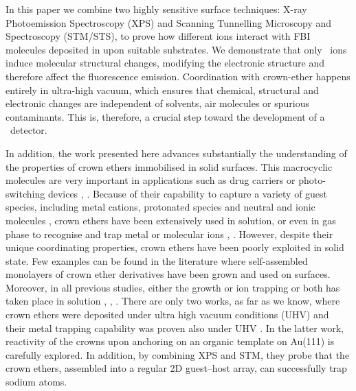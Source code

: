 \documentclass[aps,prl,reprint,longbibliography,superscriptaddress, english]{revtex4-1}
\begin{document}
In this paper we combine two highly sensitive surface techniques: X-ray Photoemission Spectroscopy (XPS) and Scanning Tunnelling Microscopy and Spectroscopy (STM/STS), to prove how different ions interact with FBI molecules deposited in upon suitable substrates. We demonstrate that only \Bapp\ ions induce molecular structural changes, modifying the electronic structure and therefore affect the fluorescence emission. Coordination with crown-ether happens entirely in ultra-high vacuum, which ensures that chemical, structural and electronic changes are independent of solvents, air molecules or spurious contaminants. This is, therefore, a crucial step toward the development of a \Bapp\ detector. 

In addition, the work presented here advances substantially the understanding of the properties of crown ethers immobilised in solid surfaces. 
This macrocyclic molecules are very important in applications such as drug carriers \cite{uchegbu_non-ionic_1998} or photo-switching devices \cite{malval_photoswitching_2002}, \cite{uda_membrane_2005}. Because of their capability to capture a variety of guest species, including metal cations, protonated species and neutral and ionic molecules \cite{dobler1981ionophores}, crown ethers \cite{gokel_crown_1991} have been extensively used in solution, or even in gas phase to recognise and trap metal or molecular ions \cite{more_intrinsic_1999}, \cite{maleknia_cavity-size-dependent_2002}. However, despite their unique coordinating properties, crown ethers have been poorly exploited in solid state. Few examples can be found in the literature where self-assembled monolayers of crown ether derivatives have been grown and used on surfaces. Moreover, in all previous studies, either the growth or ion trapping or both has taken place in solution \cite{yoshimoto_hostguest_2003}, \cite{flink_recognition_1999}, \cite{inokuchi_new_2015}. 
 There are only two works, as far as we know, where crown ethers were deposited under ultra high vacuum conditions (UHV) \cite{feng_growth_2018} and their metal trapping capability was proven also under UHV \cite{stredansky_-surface_2019}. In the latter work, reactivity of the crowns upon anchoring on an organic template on Au(111) is carefully explored. In addition, by combining XPS and STM, they probe that the crown ethers, assembled into a regular 2D guest--host array, can successfully trap sodium atoms.
\end{document}
